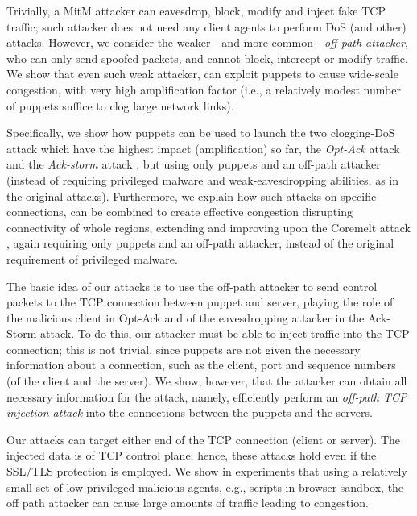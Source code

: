 \documentclass[conference]{IEEEtran}
\begin{document}
Trivially, a MitM attacker can eavesdrop, block, modify and inject fake TCP traffic; such attacker does not need any client agents to perform DoS (and other) attacks. However, we consider the weaker - and more common - {\em off-path attacker}, who can only send spoofed packets, and cannot block, intercept or modify traffic. We show that even such weak attacker, can exploit puppets to cause wide-scale congestion, with very high amplification factor (i.e., a relatively modest number of puppets suffice to clog large network links). 

Specifically, we show how puppets can be used to launch the two clogging-DoS attack which have the highest impact (amplification) so far, the {\em Opt-Ack} attack \cite{SBB05:OptAck} and the {\em Ack-storm} attack \cite{AH11:Ack}, but using only puppets and an off-path attacker (instead of requiring privileged malware and weak-eavesdropping abilities, as in the original attacks). Furthermore, we explain how such attacks on specific connections, can be combined to create effective congestion disrupting connectivity of whole regions, extending and improving upon the Coremelt attack \cite{conf/esorics/StuderP09}, again requiring only puppets and an off-path attacker, instead of the original requirement of privileged malware. 

The basic idea of our attacks is to use the off-path attacker to send control packets to the TCP connection between puppet and server, playing the role of the malicious client in Opt-Ack and of the eavesdropping attacker in the Ack-Storm attack.
To do this, our attacker must be able to inject traffic into the TCP connection; this is not trivial, since puppets are not given the necessary information about a connection, such as the client, port and sequence numbers (of the client and the server). We show, however, that the attacker can obtain all necessary information for the attack, namely, efficiently perform an {\em off-path TCP injection attack} into the connections between the puppets and the servers. 

Our attacks can target either end of the TCP connection (client or server). The injected data is of TCP control plane; hence, these attacks hold even if the SSL/TLS protection is employed. We show in experiments that using a relatively small set of low-privileged malicious agents, e.g., scripts in browser sandbox, the off path attacker can cause large amounts of traffic leading to congestion. 
 
\end{document}
